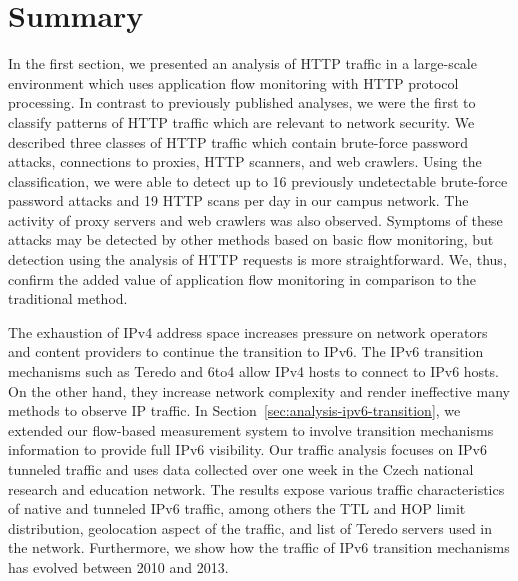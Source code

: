 \section{Summary}\label{sec:use-cases-summary}

In the first section, we presented an analysis of HTTP traffic in a large-scale environment which uses application flow monitoring with HTTP protocol processing. In contrast to previously published analyses, we were the first to classify patterns of HTTP traffic which are relevant to network security. We described three classes of HTTP traffic which contain brute-force password attacks, connections to proxies, HTTP scanners, and web crawlers. Using the classification, we were able to detect up to 16 previously undetectable brute-force password attacks and 19 HTTP scans per day in our campus network. The activity of proxy servers and web crawlers was also observed. Symptoms of these attacks may be detected by other methods based on basic flow monitoring, but detection using the analysis of HTTP requests is more straightforward. We, thus, confirm the added value of application flow monitoring in comparison to the traditional method.

The exhaustion of IPv4 address space increases pressure on network operators and content providers to continue the transition to IPv6. The IPv6 transition mechanisms such as Teredo and 6to4 allow IPv4 hosts to connect to IPv6 hosts. On the other hand, they increase network complexity and render ineffective many methods to observe IP traffic. In Section~\ref{sec:analysis-ipv6-transition}, we extended our flow-based measurement system to involve transition mechanisms information to provide full IPv6 visibility. Our traffic analysis focuses on IPv6 tunneled traffic and uses data collected over one week in the Czech national research and education network. The results expose various traffic characteristics of native and tunneled IPv6 traffic, among others the TTL and HOP limit distribution, geolocation aspect of the traffic, and list of Teredo servers used in the network. Furthermore, we show how the traffic of IPv6 transition mechanisms has evolved between 2010 and 2013.


